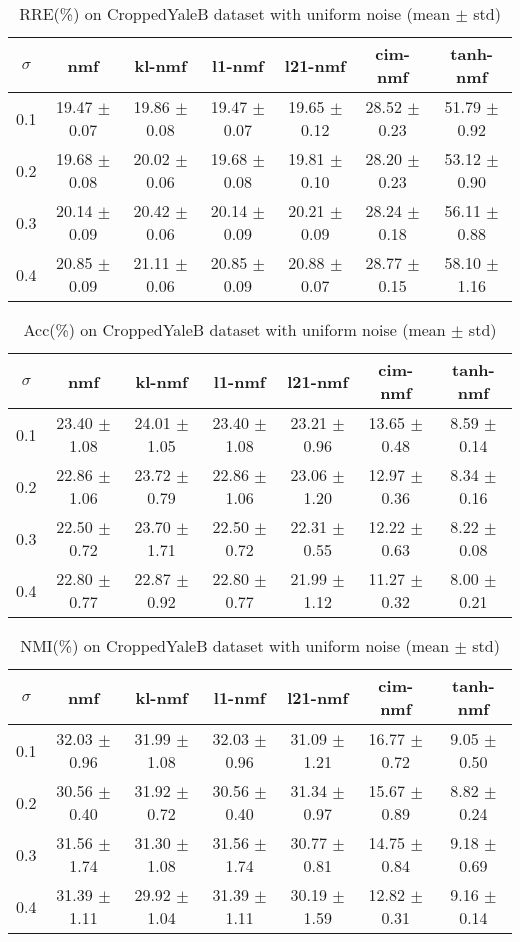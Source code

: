 \documentclass{article} %
\begin{document}
\begin{table}
\begin{tabular}{c|cccccc}$\sigma$ & nmf & kl-nmf & l1-nmf & l21-nmf & cim-nmf & tanh-nmf \\\hline
0.1 & 19.47 $\pm$ 0.07 & 19.86 $\pm$ 0.08 & 19.47 $\pm$ 0.07 & 19.65 $\pm$ 0.12 & 28.52 $\pm$ 0.23 & 51.79 $\pm$ 0.92 \\
0.2 & 19.68 $\pm$ 0.08 & 20.02 $\pm$ 0.06 & 19.68 $\pm$ 0.08 & 19.81 $\pm$ 0.10 & 28.20 $\pm$ 0.23 & 53.12 $\pm$ 0.90 \\
0.3 & 20.14 $\pm$ 0.09 & 20.42 $\pm$ 0.06 & 20.14 $\pm$ 0.09 & 20.21 $\pm$ 0.09 & 28.24 $\pm$ 0.18 & 56.11 $\pm$ 0.88 \\
0.4 & 20.85 $\pm$ 0.09 & 21.11 $\pm$ 0.06 & 20.85 $\pm$ 0.09 & 20.88 $\pm$ 0.07 & 28.77 $\pm$ 0.15 & 58.10 $\pm$ 1.16 \\
\end{tabular}\caption{
  RRE(\%) on CroppedYaleB dataset with uniform noise (mean $\pm$ std)
  \label{tab:RRE-CroppedYaleB-uniform}
}\end{table}
\begin{table}
\begin{tabular}{c|cccccc}$\sigma$ & nmf & kl-nmf & l1-nmf & l21-nmf & cim-nmf & tanh-nmf \\\hline
0.1 & 23.40 $\pm$ 1.08 & 24.01 $\pm$ 1.05 & 23.40 $\pm$ 1.08 & 23.21 $\pm$ 0.96 & 13.65 $\pm$ 0.48 & 8.59 $\pm$ 0.14 \\
0.2 & 22.86 $\pm$ 1.06 & 23.72 $\pm$ 0.79 & 22.86 $\pm$ 1.06 & 23.06 $\pm$ 1.20 & 12.97 $\pm$ 0.36 & 8.34 $\pm$ 0.16 \\
0.3 & 22.50 $\pm$ 0.72 & 23.70 $\pm$ 1.71 & 22.50 $\pm$ 0.72 & 22.31 $\pm$ 0.55 & 12.22 $\pm$ 0.63 & 8.22 $\pm$ 0.08 \\
0.4 & 22.80 $\pm$ 0.77 & 22.87 $\pm$ 0.92 & 22.80 $\pm$ 0.77 & 21.99 $\pm$ 1.12 & 11.27 $\pm$ 0.32 & 8.00 $\pm$ 0.21 \\
\end{tabular}\caption{
  Acc(\%) on CroppedYaleB dataset with uniform noise (mean $\pm$ std)
  \label{tab:Acc-CroppedYaleB-uniform}
}\end{table}
\begin{table}
\begin{tabular}{c|cccccc}$\sigma$ & nmf & kl-nmf & l1-nmf & l21-nmf & cim-nmf & tanh-nmf \\\hline
0.1 & 32.03 $\pm$ 0.96 & 31.99 $\pm$ 1.08 & 32.03 $\pm$ 0.96 & 31.09 $\pm$ 1.21 & 16.77 $\pm$ 0.72 & 9.05 $\pm$ 0.50 \\
0.2 & 30.56 $\pm$ 0.40 & 31.92 $\pm$ 0.72 & 30.56 $\pm$ 0.40 & 31.34 $\pm$ 0.97 & 15.67 $\pm$ 0.89 & 8.82 $\pm$ 0.24 \\
0.3 & 31.56 $\pm$ 1.74 & 31.30 $\pm$ 1.08 & 31.56 $\pm$ 1.74 & 30.77 $\pm$ 0.81 & 14.75 $\pm$ 0.84 & 9.18 $\pm$ 0.69 \\
0.4 & 31.39 $\pm$ 1.11 & 29.92 $\pm$ 1.04 & 31.39 $\pm$ 1.11 & 30.19 $\pm$ 1.59 & 12.82 $\pm$ 0.31 & 9.16 $\pm$ 0.14 \\
\end{tabular}\caption{
  NMI(\%) on CroppedYaleB dataset with uniform noise (mean $\pm$ std)
  \label{tab:NMI-CroppedYaleB-uniform}
}\end{table}
\end{document}
